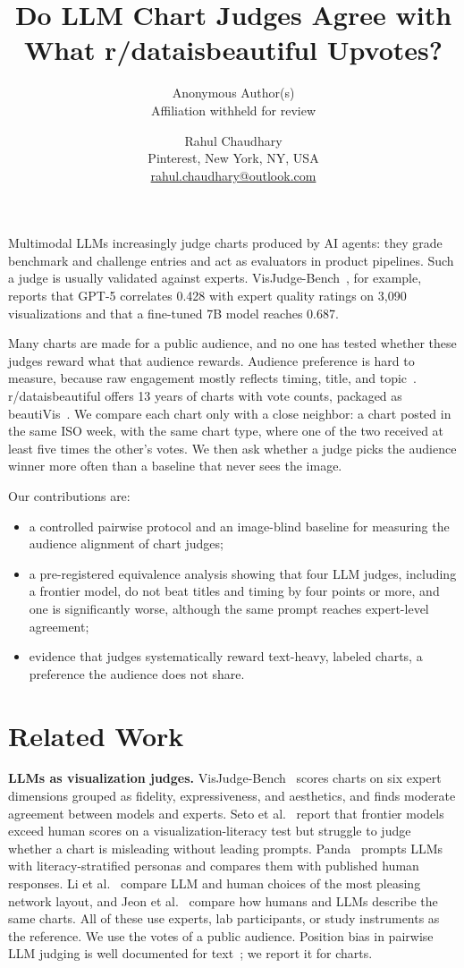 \documentclass{vgtc}
\title{Do LLM Chart Judges Agree with What r/dataisbeautiful Upvotes?}
\author{Anonymous Author(s)\\ \scriptsize Affiliation withheld for review}
\author{Rahul Chaudhary\\ \scriptsize Pinterest, New York, NY, USA \\ \scriptsize \href{mailto:rahul.chaudhary@outlook.com}{rahul.chaudhary@outlook.com}}
\begin{document}
\maketitle

Multimodal LLMs increasingly judge charts produced by AI agents: they grade benchmark and challenge entries and act as evaluators in product pipelines. Such a judge is usually validated against experts. VisJudge-Bench~\cite{xie2026visjudge}, for example, reports that GPT-5 correlates 0.428 with expert quality ratings on 3{,}090 visualizations and that a fine-tuned 7B model reaches 0.687.

Many charts are made for a public audience, and no one has tested whether these judges reward what that audience rewards. Audience preference is hard to measure, because raw engagement mostly reflects timing, title, and topic~\cite{kauer2021public}. r/dataisbeautiful offers 13 years of charts with vote counts, packaged as beautiVis~\cite{lin2026beautivis}. We compare each chart only with a close neighbor: a chart posted in the same ISO week, with the same chart type, where one of the two received at least five times the other's votes. We then ask whether a judge picks the audience winner more often than a baseline that never sees the image.

Our contributions are:
\begin{itemize}
\item a controlled pairwise protocol and an image-blind baseline for measuring the audience alignment of chart judges;
\item a pre-registered equivalence analysis showing that four LLM judges, including a frontier model, do not beat titles and timing by four points or more, and one is significantly worse, although the same prompt reaches expert-level agreement;
\item evidence that judges systematically reward text-heavy, labeled charts, a preference the audience does not share.
\end{itemize}

\section{Related Work}
\textbf{LLMs as visualization judges.} VisJudge-Bench~\cite{xie2026visjudge} scores charts on six expert dimensions grouped as fidelity, expressiveness, and aesthetics, and finds moderate agreement between models and experts. Seto et al.~\cite{seto2026literacy} report that frontier models exceed human scores on a visualization-literacy test but struggle to judge whether a chart is misleading without leading prompts. Panda~\cite{panda2026personas} prompts LLMs with literacy-stratified personas and compares them with published human responses. Li et al.~\cite{li2026beauty} compare LLM and human choices of the most pleasing network layout, and Jeon et al.~\cite{jeon2026llmsee} compare how humans and LLMs describe the same charts. All of these use experts, lab participants, or study instruments as the reference. We use the votes of a public audience. Position bias in pairwise LLM judging is well documented for text~\cite{zheng2023judging}; we report it for charts.
\end{document}
